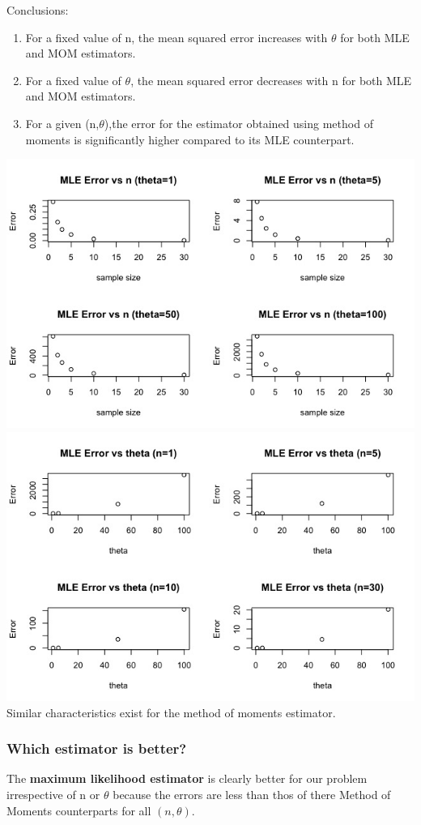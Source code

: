 \documentclass[12pt,letterpaper,titlepage,en-US]{article}
\begin{document}
Conclusions:
\begin{enumerate}
\item For a fixed value of n, the mean squared error increases with $\theta$ for both MLE and MOM estimators.
\item For a fixed value of $\theta$, the mean squared error decreases with n for both MLE and MOM estimators.
\item For a given (n,$\theta$),the error for the estimator obtained using method of moments is significantly higher compared to its MLE counterpart.
\end{enumerate}
\includegraphics[scale=0.6]{graph1.jpeg}\\
\includegraphics[scale=0.6]{graph2.jpeg}\\

Similar characteristics exist for the method of moments estimator.

\subsubsection{Which estimator is better?}
The \textbf{maximum likelihood estimator} is clearly better for our problem irrespective of n or $\theta$ because the errors are less than thos of there Method of Moments counterparts for all $(n,\theta).$
\end{document}
